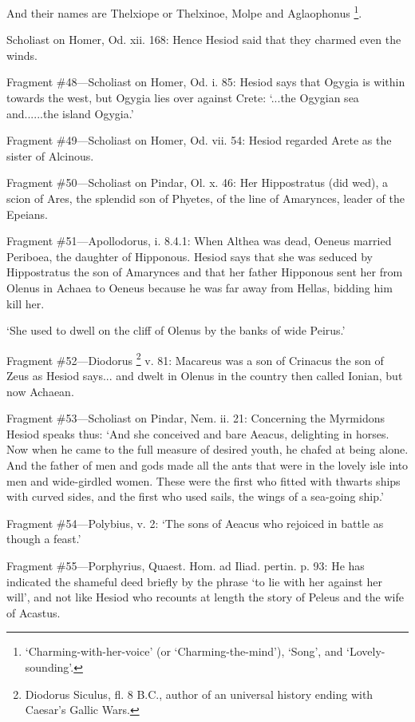 And their names are Thelxiope or Thelxinoe, Molpe and Aglaophonus \footnote{‘Charming-with-her-voice’ (or ‘Charming-the-mind’),
‘Song’, and ‘Lovely-sounding’.}.

Scholiast on Homer, Od. xii. 168: Hence Hesiod said that they charmed even the
winds.

Fragment \#48—Scholiast on Homer, Od. i. 85: Hesiod says that Ogygia is
within towards the west, but Ogygia lies over against Crete: ‘...the
Ogygian sea and......the island Ogygia.’

Fragment \#49—Scholiast on Homer, Od. vii. 54: Hesiod regarded Arete as
the sister of Alcinous.

Fragment \#50—Scholiast on Pindar, Ol. x. 46: Her Hippostratus (did wed),
a scion of Ares, the splendid son of Phyetes, of the line of Amarynces, leader
of the Epeians.

Fragment \#51—Apollodorus, i. 8.4.1: When Althea was dead, Oeneus married
Periboea, the daughter of Hipponous. Hesiod says that she was seduced by
Hippostratus the son of Amarynces and that her father Hipponous sent her from
Olenus in Achaea to Oeneus because he was far away from Hellas, bidding him
kill her.

‘She used to dwell on the cliff of Olenus by the banks of wide
Peirus.’

Fragment \#52—Diodorus \footnote{Diodorus Siculus, fl. 8
B.C., author of an universal history ending with Caesar’s Gallic Wars.} v. 81: Macareus was a son of
Crinacus the son of Zeus as Hesiod says... and dwelt in Olenus in the country
then called Ionian, but now Achaean.

Fragment \#53—Scholiast on Pindar, Nem. ii. 21: Concerning the Myrmidons
Hesiod speaks thus: ‘And she conceived and bare Aeacus, delighting in
horses. Now when he came to the full measure of desired youth, he chafed at
being alone. And the father of men and gods made all the ants that were in the
lovely isle into men and wide-girdled women. These were the first who fitted
with thwarts ships with curved sides, and the first who used sails, the wings
of a sea-going ship.’

Fragment \#54—Polybius, v. 2: ‘The sons of Aeacus who rejoiced in
battle as though a feast.’

Fragment \#55—Porphyrius, Quaest. Hom. ad Iliad. pertin. p. 93: He has
indicated the shameful deed briefly by the phrase ‘to lie with her
against her will’, and not like Hesiod who recounts at length the story
of Peleus and the wife of Acastus.

